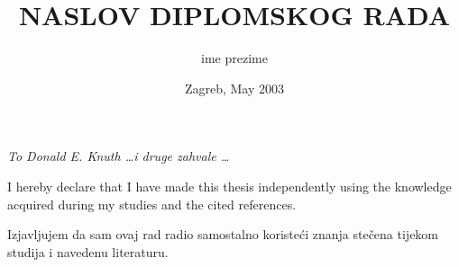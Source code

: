 \documentclass[a4paper,12pt]{report}
\title{NASLOV DIPLOMSKOG RADA}  %
\author{ime prezime}      %
\date{Zagreb, May 2003}      %
\begin{document}
%
%
\fsbkorice %
%
\fsbprvilist %
%
%
\begin{zahvala}
	\emph{To Donald E. Knuth \dots i druge zahvale \dots}
\end{zahvala}

\begin{izjava}
    I hereby declare that I have made this thesis independently using the
	knowledge acquired during my studies and the cited references.
	
	\bigskip
	
	Izjavljujem da sam ovaj rad radio samostalno koristeći znanja stečena
	tijekom studija i navedenu literaturu.
\end{izjava}

% 

\clearpage
\ifpdf
\fi
{}
\tableofcontents

%
\clearpage
\ifpdf
\fi
{}
\listoffigures

\clearpage
{}
\listoftables

%

\clearpage
\ifpdf
\fi
{}
\markboth{\MakeUppercase\nomname}{\MakeUppercase\nomname}
\printnomenclature

\clearpage
{}\addtocounter{brojstrana}{-1}
\end{document}
